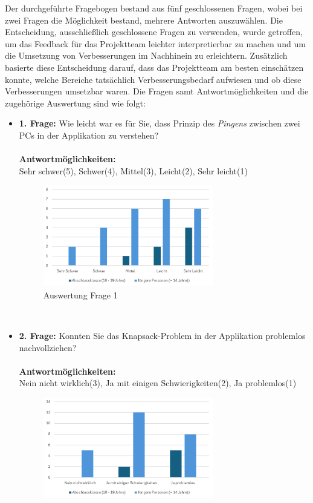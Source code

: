 Der durchgeführte Fragebogen bestand aus fünf geschlossenen Fragen, wobei bei zwei Fragen die Möglichkeit bestand, mehrere
Antworten auszuwählen. Die Entscheidung, ausschließlich geschlossene Fragen zu verwenden, wurde getroffen, um das Feedback
für das Projektteam leichter interpretierbar zu machen und um die Umsetzung von Verbesserungen im Nachhinein zu erleichtern.
Zusätzlich basierte diese Entscheidung darauf, dass das Projektteam am besten einschätzen konnte, welche Bereiche tatsächlich
Verbesserungsbedarf aufwiesen und ob diese Verbesserungen umsetzbar waren. Die Fragen samt Antwortmöglichkeiten und die
zugehörige Auswertung sind wie folgt:
\begin{itemize}
    \item \textbf{1. Frage:} Wie leicht war es für Sie, dass Prinzip des \textit{Pingens} zwischen zwei PCs in der Applikation zu verstehen?
    \\
    \\
    \textbf{Antwortmöglichkeiten:} \\
    Sehr schwer(5), Schwer(4), Mittel(3), Leicht(2), Sehr leicht(1)
    \\
    \begin{figure}[H]
        \centering
        \includegraphics[width=0.7\textwidth]{images/AuswertungFrage1}
        \caption{Auswertung Frage 1}
        \label{fig:fr1}
    \end{figure}
    \\
    \item \textbf{2. Frage:} Konnten Sie das Knapsack-Problem in der Applikation problemlos nachvollziehen?
    \\
    \\
    \textbf{Antwortmöglichkeiten:}\\
    Nein nicht wirklich(3), Ja mit einigen Schwierigkeiten(2), Ja problemlos(1)
    \\
    \begin{figure}[H]
        \centering
        \includegraphics[width=0.7\textwidth]{images/AuswertungFrage2}

\end{figure}
\end{itemize}
